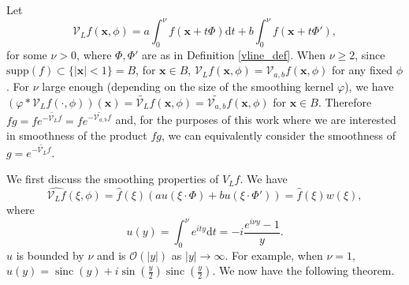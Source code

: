 \documentclass[a4paper,12pt]{amsart}
\numberwithin{equation}{section}
\theoremstyle{plain}
\numberwithin{theorem}{section}
\theoremstyle{definition}
\theoremstyle{remark}
\theoremstyle{remark}
\theoremstyle{remark}
\newcommand{\paren}[1]{\left(#1\right)}               %
\newcommand{\vx}{{\mathbf{x}}}
\newcommand{\seanc}[1]{\begin{quotation}\textbf{Sean's comment:\
}{\textit{#1}}\end{quotation}}
\DeclareMathOperator{\sinc}{sinc}
\begin{document}
Let 
\begin{equation}
\mathcal{V}_L f(\vx,\phi) = a\int_0^\nu f(\vx + t\Phi) \mathrm{d}t + b\int_0^\nu f(\vx + t\Phi'),
\end{equation}
for some $\nu > 0$, where $\Phi, \Phi'$ are as in Definition \ref{vline_def}. When $\nu\geq 2$, since $\text{supp}(f) \subset \{|\vx| < 1\} = B$, for $\vx\in B$, $\mathcal{V}_Lf(\vx,\phi) = \mathcal{V}_{a,b}f(\vx,\phi)$ for any fixed $\phi$. For $\nu$ large enough (depending on the size of the smoothing kernel $\varphi$), we have $\paren{\varphi \ast \mathcal{V}_Lf(\cdot,\phi)}(\vx) =  \widetilde{\mathcal{V}_L}f(\vx,\phi) =  \widetilde{\mathcal{V}_{a,b}}f(\vx,\phi)$ for $\vx \in B$. Therefore $fg = fe^{- \widetilde{\mathcal{V}_L}f} = fe^{- \widetilde{\mathcal{V}_{a,b}}f}$ and, for the purposes of this work where we are interested in smoothness of the product $fg$, we can equivalently consider the smoothness of $g = e^{- \widetilde{\mathcal{V}_L}f}$. 

We first discuss the smoothing properties of $V_Lf$. We have
\begin{equation} \label{Vlhat}
\widehat{\mathcal{V}_L f}(\xi,\phi) = \hat{f}(\xi)\paren{ a u(\xi\cdot\Phi) + b u(\xi\cdot \Phi') }= \hat{f}(\xi) w(\xi),
\end{equation}
where
\begin{equation}
u(y) = \int_0^\nu e^{i t y} \mathrm{d}t = -i\frac{e^{i \nu y} - 1}{y}.
\end{equation}
$u$ is bounded by $\nu$ and is $\mathcal{O}(|y|)$ as $|y| \rightarrow \infty$. For example, when $\nu = 1$, $u(y) = \sinc(y) + i\sin(\frac{y}{2}) \sinc(\frac{y}{2})$. We now have the following theorem.

\end{document}
